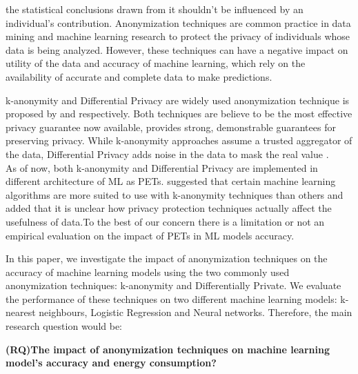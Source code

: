 the statistical conclusions drawn from it shouldn't be influenced by an individual's contribution.
Anonymization techniques are  common practice in data mining and machine learning research to protect the privacy of individuals whose data is being analyzed. However, these techniques can have a negative impact on utility of the data\cite{rodriguez2020contribution} and accuracy of machine learning, which rely on the availability of accurate and complete data to make predictions\cite{}.

k-anonymity and Differential Privacy are widely used anonymization technique is proposed by \cite{sweeney2002k} and \cite{dwork2006differential} respectively. Both techniques are believe to be the most effective privacy guarantee now available, provides strong, demonstrable guarantees for preserving privacy\cite{liu2019k}. While k-anonymity approaches assume a trusted aggregator of the data, Differential Privacy adds noise in the data to mask the real value .\\

As of now, both k-anonymity and Differential Privacy are  implemented in different architecture of ML as PETs. \cite{wimmer2014comparison} suggested that certain machine learning algorithms are more suited to use with k-anonymity techniques than others and \cite{rodriguez2020contribution} added that it is unclear how privacy protection techniques actually affect the usefulness of data.To the best of our concern there is a limitation or not an empirical evaluation on the impact of PETs in ML models accuracy. 


In this paper, we investigate the impact of anonymization techniques on the accuracy of machine learning models using the  two commonly used anonymization techniques: k-anonymity and  Differentially Private. We evaluate the performance of these techniques on two different machine learning models: k-nearest neighbours, Logistic Regression and Neural networks. Therefore, the main research question would be:
\begin{center}
    \textbf{ \textbf{(RQ)The impact of anonymization techniques on machine learning model's accuracy and energy consumption?}}
\end{center}


